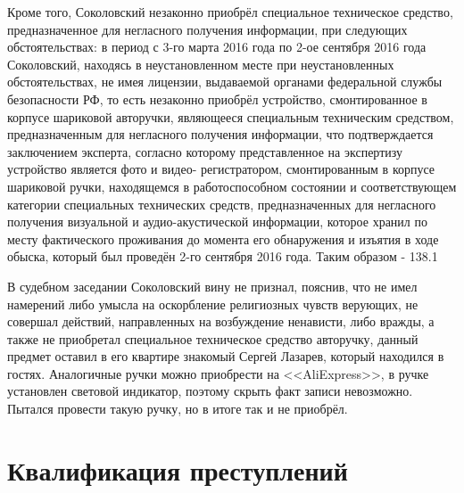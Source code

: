 \documentclass[a4paper]{article}
\begin{document}
		Кроме того, Соколовский незаконно приобрёл специальное техническое средство, предназначенное для негласного получения информации, при следующих обстоятельствах: в период с 3-го марта 2016 года по 2-ое сентября 2016 года Соколовский, находясь в неустановленном месте при неустановленных обстоятельствах, не имея лицензии, выдаваемой органами федеральной службы безопасности РФ, то есть незаконно приобрёл устройство, смонтированное в корпусе шариковой авторучки, являющееся специальным техническим средством, предназначенным для негласного получения информации, что подтверждается заключением эксперта, согласно которому представленное на экспертизу устройство является фото и видео- регистратором, смонтированным в корпусе шариковой ручки, находящемся в работоспособном состоянии и соответствующем категории специальных технических средств, предназначенных для негласного получения визуальной и аудио-акустической информации, которое хранил по месту фактического проживания до момента его обнаружения и изъятия в ходе обыска, который был проведён 2-го сентября 2016 года. Таким образом - 138.1
	
		В судебном заседании Соколовский вину не признал, пояснив, что не имел намерений либо умысла на оскорбление религиозных чувств верующих, не совершал действий, направленных на возбуждение ненависти, либо вражды, а также не приобретал специальное техническое средство авторучку, данный предмет оставил в его квартире знакомый Сергей Лазарев, который находился в гостях. Аналогичные ручки можно приобрести на <<AliExpress>>, в ручке установлен световой индикатор, поэтому скрыть факт записи невозможно. Пытался провести такую ручку, но в итоге так и не приобрёл.
		
	\section{Квалификация преступлений}
	
\end{document}
